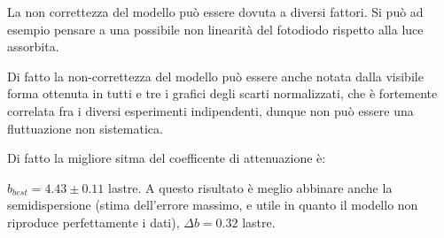 \documentclass[a4paper,10pt]{article}
\begin{document}
La non correttezza del modello può essere dovuta a diversi fattori. Si può ad esempio pensare a una possibile non linearità del fotodiodo rispetto alla luce assorbita. 

Di fatto la non-correttezza del modello può essere anche notata dalla visibile forma ottenuta in tutti e tre i grafici degli scarti normalizzati, che è fortemente correlata fra i diversi esperimenti indipendenti, dunque non può essere una fluttuazione non sistematica.

Di fatto la migliore sitma del coefficente di attenuazione è:

$b_{best}=4.43 \pm 0.11$ lastre.%
A questo risultato è meglio abbinare anche la semidispersione (stima dell'errore massimo, e utile in quanto il modello non riproduce perfettamente i dati), $\Delta b=0.32$ lastre. 
\end{document}
